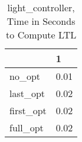 \begin{table}
\caption{light\_controller, Time in Seconds to Compute LTL}
\label{light_controller_LTL_time}
\begin{tabular}{ll}
\toprule
 & 1 \\
\midrule
no\_opt & 0.01 \\
last\_opt & 0.02 \\
first\_opt & 0.02 \\
full\_opt & 0.02 \\
\bottomrule
\end{tabular}
\end{table}
